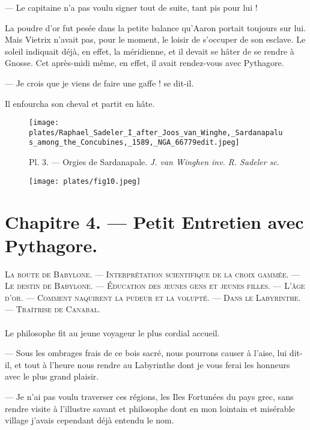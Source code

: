 \documentclass[a4paper, 11pt, oneside, polutonikogreek, french]{article}
\begin{document}
--- Le capitaine n'a pas voulu signer tout de suite, tant pis pour lui !

La poudre d'or fut pesée dans la petite balance qu'Aaron portait toujours sur lui. Mais Vietrix n'avait pas, pour le moment, le loisir de s'occuper de son esclave. Le soleil indiquait déjà, en effet, la méridienne, et il devait se hâter de se rendre à Gnosse. Cet après-midi même, en effet, il avait rendez-vous avec Pythagore.

--- Je crois que je viens de faire une gaffe ! se dit-il.

Il enfourcha son cheval et partit en hâte.
\clearpage
\begin{landscape}
\begin{figure}[H]
\centering
\texttt{[image: plates/Raphael\_Sadeler\_I\_after\_Joos\_van\_Winghe,\_Sardanapalus\_among\_the\_Concubines,\_1589,\_NGA\_66779edit.jpeg]}
\caption{\Fontauri Pl. 3. --- Orgies de Sardanapale. \emph{J. van Winghen inv.} \emph{R. Sadeler sc.}}
\end{figure}
\end{landscape}
\clearpage
\begin{figure}[H]
\centering
\texttt{[image: plates/fig10.jpeg]}
\end{figure}
\section{Chapitre 4. --- Petit Entretien avec Pythagore.}
\begin{center}
\scshape
\small
La route de Babylone. --- Interprétation scientifique de la croix gammée. --- Le destin de Babylone. --- Éducation des jeunes gens et jeunes filles. --- L'âge d'or. --- Comment naquirent la pudeur et la volupté. --- Dans le Labyrinthe. --- Traîtrise de Canabal.
\end{center}
\paragraph{}
Le philosophe fit au jeune voyageur le plus cordial accueil.

--- Sous les ombrages frais de ce bois sacré, nous pourrons causer à l'aise, lui dit-il, et tout à l'heure nous rendre au Labyrinthe dont je vous ferai les honneurs avec le plus grand plaisir.

--- Je n'ai pas voulu traverser ces régions, les Iles Fortunées du pays grec, sans rendre visite à l'illustre savant et philosophe dont en mon lointain et misérable village j'avais cependant déjà entendu le nom.
\end{document}
